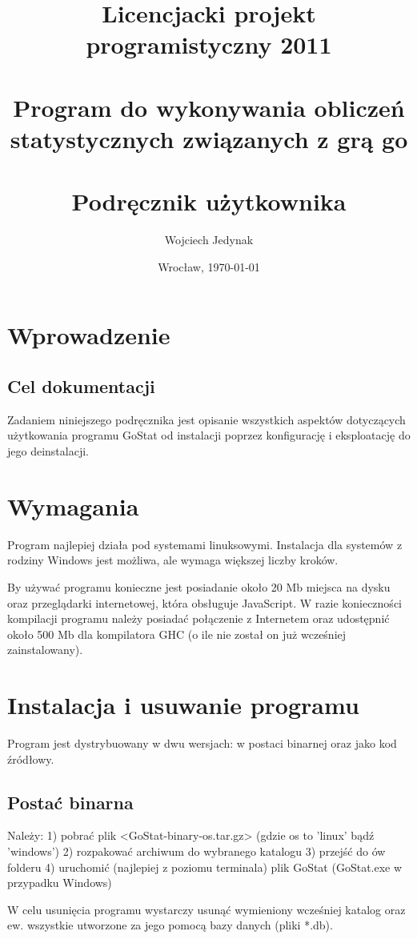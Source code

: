 \documentclass[10pt,leqno]{article}
\title{\LARGE Licencjacki projekt programistyczny 2011 \\ 
       \ \\
       Program do wykonywania obliczeń statystycznych związanych z grą go \\ 
       \ \\
       Podręcznik użytkownika }
\author{Wojciech Jedynak}
\date{Wrocław, \today}
\begin{document}
\maketitle 

\thispagestyle{empty}
\tableofcontents

\newpage

\section{Wprowadzenie}

\subsection{Cel dokumentacji}
Zadaniem niniejszego podręcznika jest opisanie wszystkich aspektów dotyczących użytkowania programu GoStat od instalacji poprzez konfigurację
i eksploatację do jego deinstalacji.

\section{Wymagania}
Program najlepiej działa pod systemami linuksowymi. Instalacja dla systemów z rodziny Windows jest możliwa, ale wymaga większej liczby kroków. 

By używać programu konieczne jest posiadanie około 20 Mb miejsca na dysku oraz przeglądarki internetowej, która obsługuje JavaScript. 
W razie konieczności kompilacji programu należy posiadać połączenie z Internetem oraz udostępnić około 500 Mb dla kompilatora GHC (o ile nie 
został on już wcześniej zainstalowany).

\section{Instalacja i usuwanie programu}
Program jest dystrybuowany w dwu wersjach: w postaci binarnej oraz jako kod źródłowy.

\subsection{Postać binarna}
Należy: 
1) pobrać plik <GoStat-binary-os.tar.gz> (gdzie os to 'linux' bądź 'windows')
2) rozpakować archiwum do wybranego katalogu
3) przejść do ów folderu
4) uruchomić (najlepiej z poziomu terminala) plik GoStat (GoStat.exe w przypadku Windows)

W celu usunięcia programu wystarczy usunąć wymieniony wcześniej katalog oraz ew. wszystkie utworzone za jego pomocą bazy danych (pliki *.db).
\end{document}
